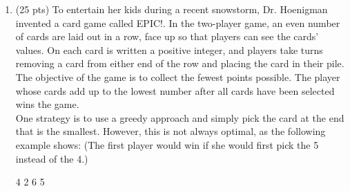 \documentclass[12pt]{article}
\theoremstyle{remark}
\begin{document}
\begin{enumerate}
\item (25 pts) To entertain her kids during a recent snowstorm, Dr. Hoenigman invented a card game called EPIC!. In the two-player game, an even number of cards are laid out in a row, face up so that players can see the cards' values. On each card is written a positive integer, and players take turns removing a card from either end of the row and placing the card in their pile. The objective of the game is to collect the fewest points possible. The player whose cards add up to the lowest number after all cards have been selected wins the game.
\\One strategy is to use a greedy approach and simply pick the card at the end that is the smallest. However, this is not always optimal, as the following example shows: (The first player would win if she would first pick the 5 instead of the 4.)

4 2 6 5


\end{enumerate}
\end{document}
